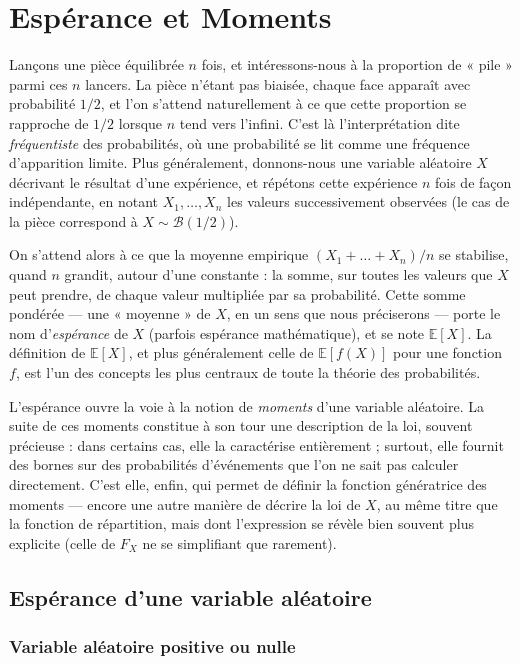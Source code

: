 \chapter{Espérance et Moments}

Lançons une pièce équilibrée $n$ fois, et intéressons-nous à la proportion de « pile » parmi ces $n$ lancers. La pièce n'étant pas biaisée, chaque face apparaît avec probabilité $1/2$, et l'on s'attend naturellement à ce que cette proportion se rapproche de $1/2$ lorsque $n$ tend vers l'infini. C'est là l'interprétation dite \emph{fréquentiste} des probabilités, où une probabilité se lit comme une fréquence d'apparition limite. Plus généralement, donnons-nous une variable aléatoire $X$ décrivant le résultat d'une expérience, et répétons cette expérience $n$ fois de façon indépendante, en notant $X_1, \dots, X_n$ les valeurs successivement observées (le cas de la pièce correspond à $X \sim \mathcal{B}(1/2)$).

On s'attend alors à ce que la moyenne empirique $(X_1 + \dots + X_n)/n$ se stabilise, quand $n$ grandit, autour d'une constante : la somme, sur toutes les valeurs que $X$ peut prendre, de chaque valeur multipliée par sa probabilité. Cette somme pondérée — une « moyenne » de $X$, en un sens que nous préciserons — porte le nom d'\emph{espérance} de $X$ (parfois espérance mathématique), et se note $\mathbb{E}[X]$. La définition de $\mathbb{E}[X]$, et plus généralement celle de $\mathbb{E}[f(X)]$ pour une fonction $f$, est l'un des concepts les plus centraux de toute la théorie des probabilités.

L'espérance ouvre la voie à la notion de \emph{moments} d'une variable aléatoire. La suite de ces moments constitue à son tour une description de la loi, souvent précieuse : dans certains cas, elle la caractérise entièrement ; surtout, elle fournit des bornes sur des probabilités d'événements que l'on ne sait pas calculer directement. C'est elle, enfin, qui permet de définir la fonction génératrice des moments — encore une autre manière de décrire la loi de $X$, au même titre que la fonction de répartition, mais dont l'expression se révèle bien souvent plus explicite (celle de $F_X$ ne se simplifiant que rarement).

\section{Espérance d'une variable aléatoire}

\subsection{Variable aléatoire positive ou nulle}

